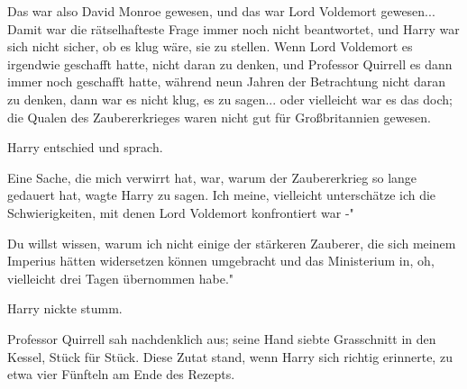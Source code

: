 Das war also David Monroe gewesen, und das war Lord Voldemort gewesen... Damit
war die rätselhafteste Frage immer noch nicht beantwortet, und Harry war sich
nicht sicher, ob es klug wäre, sie zu stellen. Wenn Lord Voldemort es irgendwie
geschafft hatte, nicht daran zu denken, und Professor Quirrell es dann immer
noch geschafft hatte, während neun Jahren der Betrachtung nicht daran zu denken,
dann war es nicht klug, es zu sagen... oder vielleicht war es das doch; die
Qualen des Zaubererkrieges waren nicht gut für Großbritannien gewesen.

Harry entschied und sprach.

\glqq{}Eine Sache, die mich verwirrt hat, war, warum der Zaubererkrieg so lange
gedauert hat\grqq{}, wagte Harry zu sagen. \glqq{}Ich meine, vielleicht
unterschätze ich die Schwierigkeiten, mit denen Lord Voldemort konfrontiert war
-"

\glqq{}Du willst wissen, warum ich nicht einige der stärkeren Zauberer, die sich
meinem Imperius hätten widersetzen können umgebracht und das Ministerium in, oh,
vielleicht drei Tagen übernommen habe."

Harry nickte stumm.

Professor Quirrell sah nachdenklich aus; seine Hand siebte Grasschnitt in den
Kessel, Stück für Stück. Diese Zutat stand, wenn Harry sich richtig erinnerte,
zu etwa vier Fünfteln am Ende des Rezepts.

